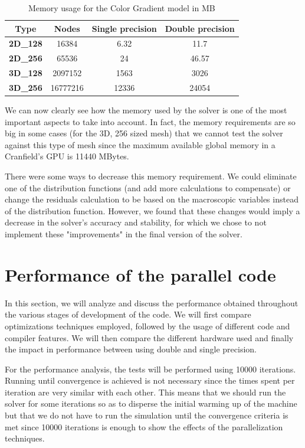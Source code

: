 \documentclass[12pt, openany]{book}
\begin{document}
\begin{table}[H]
	\centering
	\begin{tabular}{|c|c|c|c|}
		\hline
		\textbf{Type}    & \textbf{Nodes} & \textbf{Single precision} & \textbf{Double precision} \\ \hline
		\textbf{2D\_128} & 16384          & 6.32                      & 11.7                      \\ \hline
		\textbf{2D\_256} & 65536          & 24                        & 46.57                     \\ \hline
		\textbf{3D\_128} & 2097152        & 1563                      & 3026                      \\ \hline
		\textbf{3D\_256} & 16777216       & 12336                     & 24054                     \\ \hline
	\end{tabular}
	\caption{Memory usage for the Color Gradient model in MB}
	\label{tab:memCG}
\end{table}

We can now clearly see how the memory used by the solver is one of the most important aspects to take into account. In fact, the memory requirements are so big in some cases (for the 3D, 256 sized mesh) that we cannot test the solver against this type of mesh since the maximum available global memory in a Cranfield's GPU is 11440 MBytes. \par
There were some ways to decrease this memory requirement. We could eliminate one of the distribution functions (and add more calculations to compensate) or change the residuals calculation to be based on the macroscopic variables instead of the distribution function. However, we found that these changes would imply a decrease in the solver's accuracy and stability, for which we chose to not implement these "improvements" in the final version of the solver.

\section{Performance of the parallel code}\label{sec:performance}
In this section, we will analyze and discuss the performance obtained throughout the various stages of development of the code. We will first compare optimizations techniques employed, followed by the usage of different code and compiler features. We will then compare the different hardware used and finally the impact in performance between using double and single precision. \par
For the performance analysis, the tests will be performed using 10000 iterations. Running until convergence is achieved is not necessary since the times spent per iteration are very similar with each other. This means that we should run the solver for some iterations so as to disperse the initial warming up of the machine but that we do not have to run the simulation until the convergence criteria is met since 10000 iterations is enough to show the effects of the parallelization techniques.
\end{document}
